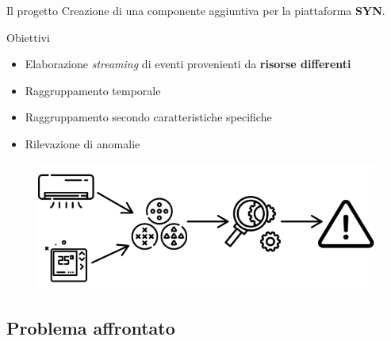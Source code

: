 \documentclass{beamer}
\begin{document}
	\begin{frame}{Il progetto}
	\vspace{.5em}
		Creazione di una componente aggiuntiva per la piattaforma \textbf{SYN}. \vspace{.2em}
		
		\begin{block}{Obiettivi}
			\begin{itemize}
				\item Elaborazione \textit{streaming} di eventi provenienti da \textbf{risorse differenti} \vspace{.5em}
				\item Raggruppamento temporale \vspace{.5em}
				\item Raggruppamento secondo caratteristiche specifiche \vspace{.5em}
				\item Rilevazione di anomalie \vspace{.5em} 			
			\end{itemize}
		\end{block}
		
		\begin{figure}[!h] 
    		\centering 
    		\includegraphics[width=0.55\columnwidth]{../immagini/slide/elaboration_example.png}
		\end{figure}
		
	\end{frame}
	
	\subsection{Problema affrontato}
\end{document}
